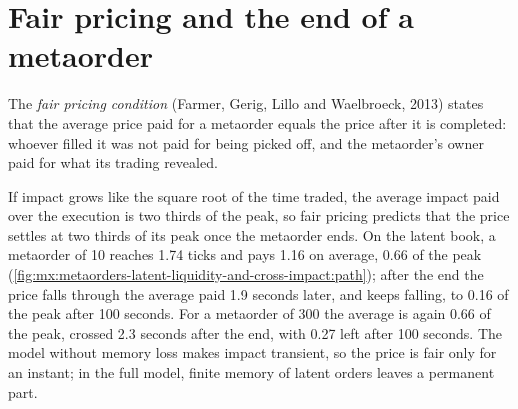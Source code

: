 \section{Fair pricing and the end of a metaorder}

\begin{definition}\label{def:mx:metaorders-latent-liquidity-and-cross-impact:fair}
The \emph{fair pricing condition} (Farmer, Gerig, Lillo and Waelbroeck, 2013) states that the average price paid for a
metaorder equals the price after it is completed: whoever filled it was not paid for being picked off, and the metaorder's owner paid for what its trading
revealed.
\end{definition}

If impact grows like the square root of the time traded, the average impact paid over the execution is two thirds of the peak, so fair pricing predicts
that the price settles at two thirds of its peak once the metaorder ends. On the latent book, a metaorder of 10 reaches 1.74 ticks and pays 1.16 on average,
0.66 of the peak (\cref{fig:mx:metaorders-latent-liquidity-and-cross-impact:path}); after the end the price falls through the average paid 1.9 seconds
later, and keeps falling, to 0.16 of the peak after 100 seconds. For a metaorder of 300 the average is again 0.66 of the peak, crossed 2.3 seconds after
the end, with 0.27 left after 100 seconds. The model without memory loss makes impact transient, so the price is fair only for an instant; in the full
model, finite memory of latent orders leaves a permanent part.

\begin{omfigure}

\label{fig:mx:metaorders-latent-liquidity-and-cross-impact:path}
\end{omfigure}


